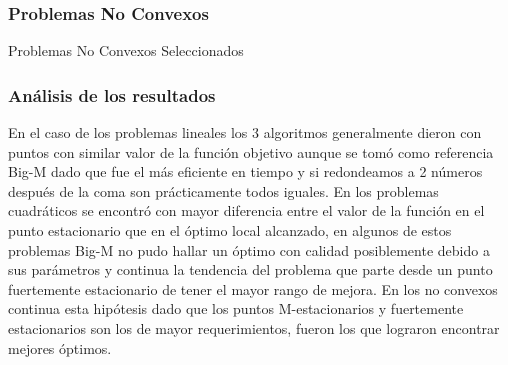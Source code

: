 \subsubsection{Problemas No Convexos}

\begin{resultstable}{Problemas No Convexos Seleccionados}
\end{resultstable}


\subsubsection{Análisis de los resultados}
En el caso de los problemas lineales los 3 algoritmos generalmente dieron con puntos con similar valor de la función objetivo aunque 
se tomó como referencia Big-M dado que fue el más eficiente en tiempo y si redondeamos a 2 números después de la coma son prácticamente todos iguales.
En los problemas cuadráticos se encontró con mayor diferencia entre el valor de la función en el punto estacionario que en el óptimo local alcanzado, en algunos de estos problemas Big-M no pudo hallar un óptimo con calidad posiblemente debido a sus parámetros y continua la tendencia del
problema que parte desde un punto fuertemente estacionario de tener el mayor rango de mejora.
En los no convexos continua esta hipótesis dado que los puntos M-estacionarios y fuertemente estacionarios son los de mayor requerimientos, fueron los que lograron encontrar mejores óptimos. 
